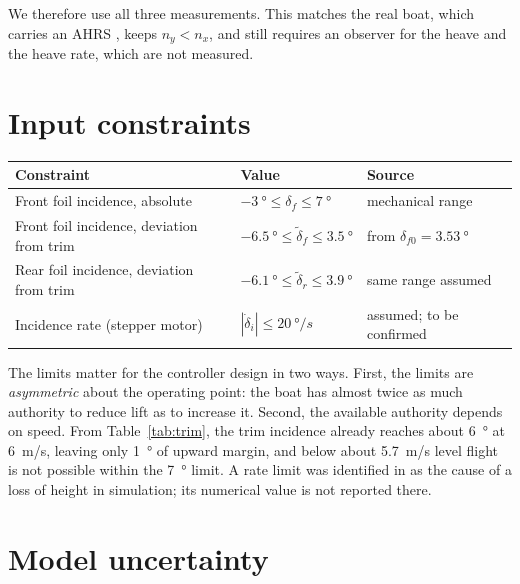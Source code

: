 \documentclass[11pt,a4paper]{article}
\newcommand{\df}{\delta_f}
\begin{document}
We therefore use all three measurements. This matches the real boat, which
carries an AHRS \cite{belime}, keeps $n_y<n_x$, and still requires an observer
for the heave and the heave rate, which are not measured.

\section{Input constraints}
\label{sec:constraints}

\begin{table}[h]
\centering
\begin{tabular}{@{}p{5.6cm}ll@{}}
\toprule
Constraint & Value & Source \\ \midrule
Front foil incidence, absolute & $\SI{-3}{\degree}\le\df\le\SI{7}{\degree}$ & mechanical range \cite{belime} \\
Front foil incidence, deviation from trim & $\SI{-6.5}{\degree}\le\tilde\delta_f\le\SI{+3.5}{\degree}$ & from $\delta_{f0}=\SI{3.53}{\degree}$ \\
Rear foil incidence, deviation from trim & $\SI{-6.1}{\degree}\le\tilde\delta_r\le\SI{+3.9}{\degree}$ & same range assumed \\
Incidence rate (stepper motor) & $|\dot\delta_i|\le\SI{20}{\degree/s}$ & assumed; to be confirmed \\
\bottomrule
\end{tabular}
\end{table}

The limits matter for the controller design in two ways. First, the limits are
\emph{asymmetric} about the operating point: the boat has almost twice as much
authority to reduce lift as to increase it. Second, the available authority
depends on speed. From Table~\ref{tab:trim}, the trim incidence already reaches
about \SI{6}{\degree} at \SI{6}{m/s}, leaving only \SI{1}{\degree} of upward
margin, and below about \SI{5.7}{m/s} level flight is not possible within the
\SI{7}{\degree} limit. A rate limit was identified in \cite{belime} as the cause
of a loss of height in simulation; its numerical value is not reported there.

\section{Model uncertainty}
\label{sec:uncertainty}
\end{document}
